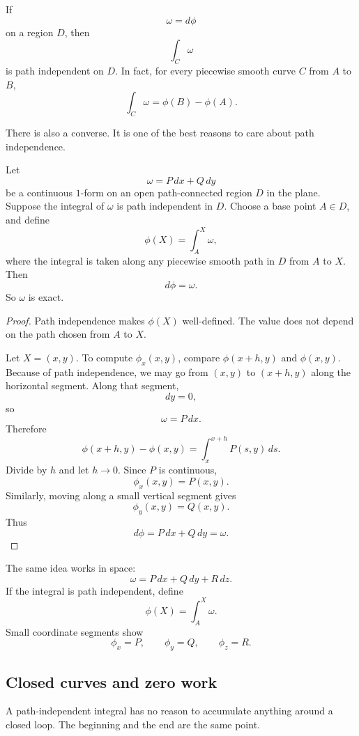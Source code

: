 \begin{theorem}
If
\[
    \omega=d\phi
\]
on a region \(D\), then
\[
    \int_C \omega
\]
is path independent on \(D\).  In fact, for every piecewise smooth curve \(C\) from
\(A\) to \(B\),
\[
\boxed{
    \int_C \omega=\phi(B)-\phi(A).
}
\]
\end{theorem}

There is also a converse.  It is one of the best reasons to care about path independence.

\begin{theorem}
Let
\[
    \omega=P\,dx+Q\,dy
\]
be a continuous \(1\)-form on an open path-connected region \(D\) in the plane.
Suppose the integral of \(\omega\) is path independent in \(D\).  Choose a base point
\(A\in D\), and define
\[
\boxed{
    \phi(X)=\int_A^X \omega,
}
\]
where the integral is taken along any piecewise smooth path in \(D\) from \(A\) to \(X\).
Then
\[
\boxed{
    d\phi=\omega.
}
\]
So \(\omega\) is exact.
\end{theorem}

\begin{proof}
Path independence makes \(\phi(X)\) well-defined.  The value does not depend on the
path chosen from \(A\) to \(X\).

Let \(X=(x,y)\).  To compute \(\phi_x(x,y)\), compare \(\phi(x+h,y)\) and
\(\phi(x,y)\).  Because of path independence, we may go from \((x,y)\) to
\((x+h,y)\) along the horizontal segment.  Along that segment,
\[
    dy=0,
\]
so
\[
    \omega=P\,dx.
\]
Therefore
\[
    \phi(x+h,y)-\phi(x,y)
    =
    \int_x^{x+h}P(s,y)\,ds.
\]
Divide by \(h\) and let \(h\to0\).  Since \(P\) is continuous,
\[
    \phi_x(x,y)=P(x,y).
\]
Similarly, moving along a small vertical segment gives
\[
    \phi_y(x,y)=Q(x,y).
\]
Thus
\[
    d\phi=P\,dx+Q\,dy=\omega.
\]
\end{proof}

The same idea works in space:
\[
    \omega=P\,dx+Q\,dy+R\,dz.
\]
If the integral is path independent, define
\[
    \phi(X)=\int_A^X\omega.
\]
Small coordinate segments show
\[
    \phi_x=P,\qquad \phi_y=Q,\qquad \phi_z=R.
\]

\subsection{Closed curves and zero work}

A path-independent integral has no reason to accumulate anything around a closed
loop.  The beginning and the end are the same point.

